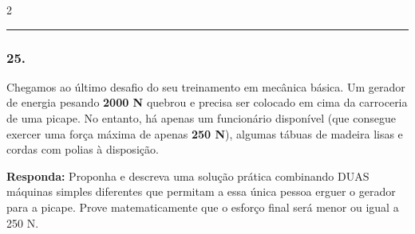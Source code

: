 \documentclass[twoside, 10pt, a4paper]{article}
\newlength{\espacoPreQuestao}\setlength{\espacoPreQuestao}{0.1cm}
\newlength{\espacoQuestao}\setlength{\espacoQuestao}{0.2cm}
\begin{document}
\begin{multicols*}{2}
\noindent\textcolor{CorLinha}{\rule{\linewidth}{0.5pt}} 
\par\vspace{\espacoPreQuestao}
\subsubsection*{25.} Chegamos ao último desafio do seu treinamento em mecânica básica. Um gerador de energia pesando \textbf{2000 N} quebrou e precisa ser colocado em cima da carroceria de uma picape. No entanto, há apenas um funcionário disponível (que consegue exercer uma força máxima de apenas \textbf{250 N}), algumas tábuas de madeira lisas e cordas com polias à disposição.
\begin{boxresponda}
\textbf{Responda:} Proponha e descreva uma solução prática combinando DUAS máquinas simples diferentes que permitam a essa única pessoa erguer o gerador para a picape. Prove matematicamente que o esforço final será menor ou igual a 250 N.
\end{boxresponda}
\par\vspace{\espacoQuestao}

\end{multicols*}
\end{document}
